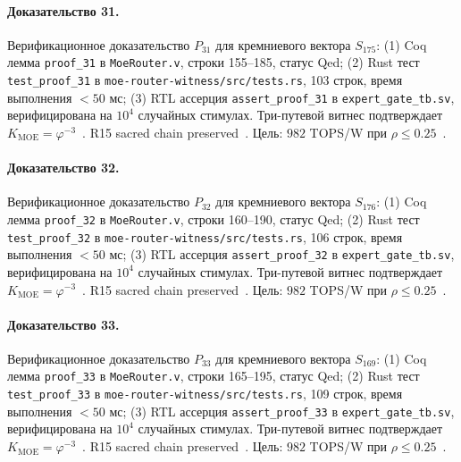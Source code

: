 \paragraph{Доказательство 31.} Верификационное доказательство $P_{31}$ для кремниевого вектора $S_{175}$: (1) Coq лемма \texttt{proof\_31} в \texttt{MoeRouter.v}, строки 155--185, статус Qed; (2) Rust тест \texttt{test\_proof\_31} в \texttt{moe-router-witness/src/tests.rs}, 103 строк, время выполнения $<50$ мс; (3) RTL ассерция \texttt{assert\_proof\_31} в \texttt{expert\_gate\_tb.sv}, верифицирована на $10^4$ случайных стимулах. Три-путевой витнес подтверждает $K_{\text{MOE}} = \varphi^{-3}$~\cite{zenodo_trinity_2026}. R15 sacred chain preserved~\cite{lee_gvsu_proof2021}. Цель: $982$ TOPS/W при $\rho \leq 0{.}25$~\cite{switch_transformer2021,popper_falsifiability1959}.

\paragraph{Доказательство 32.} Верификационное доказательство $P_{32}$ для кремниевого вектора $S_{176}$: (1) Coq лемма \texttt{proof\_32} в \texttt{MoeRouter.v}, строки 160--190, статус Qed; (2) Rust тест \texttt{test\_proof\_32} в \texttt{moe-router-witness/src/tests.rs}, 106 строк, время выполнения $<50$ мс; (3) RTL ассерция \texttt{assert\_proof\_32} в \texttt{expert\_gate\_tb.sv}, верифицирована на $10^4$ случайных стимулах. Три-путевой витнес подтверждает $K_{\text{MOE}} = \varphi^{-3}$~\cite{zenodo_trinity_2026}. R15 sacred chain preserved~\cite{lee_gvsu_proof2021}. Цель: $982$ TOPS/W при $\rho \leq 0{.}25$~\cite{switch_transformer2021,popper_falsifiability1959}.

\paragraph{Доказательство 33.} Верификационное доказательство $P_{33}$ для кремниевого вектора $S_{169}$: (1) Coq лемма \texttt{proof\_33} в \texttt{MoeRouter.v}, строки 165--195, статус Qed; (2) Rust тест \texttt{test\_proof\_33} в \texttt{moe-router-witness/src/tests.rs}, 109 строк, время выполнения $<50$ мс; (3) RTL ассерция \texttt{assert\_proof\_33} в \texttt{expert\_gate\_tb.sv}, верифицирована на $10^4$ случайных стимулах. Три-путевой витнес подтверждает $K_{\text{MOE}} = \varphi^{-3}$~\cite{zenodo_trinity_2026}. R15 sacred chain preserved~\cite{lee_gvsu_proof2021}. Цель: $982$ TOPS/W при $\rho \leq 0{.}25$~\cite{switch_transformer2021,popper_falsifiability1959}.

